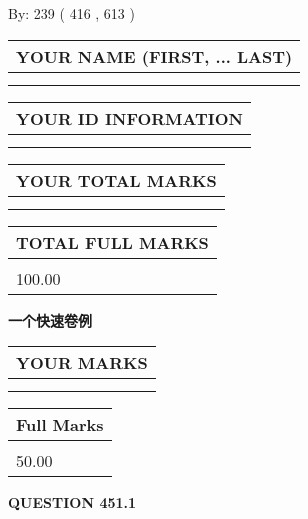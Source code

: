 \documentclass{ctexart}
\begin{document}
   
\hspace{1.0in} By: 
 239 ( 416 ,  613 )
   
   
   
   
\newpage 
\setcounter{page}{ 
   451001 } 
   
   
   
   
\noindent\begin{tabular}{|l|}
\hline
YOUR NAME (FIRST, ... LAST)  \\
\hline
 \\ 
 \\ 
\hline
\end{tabular}
\hspace{0.05in} \begin{tabular}{|l|}
\hline
 YOUR   ID   INFORMATION  \\
\hline
 \\ 
 \\ 
\hline
\end{tabular}
   
   
\vspace{0.2in}\noindent\begin{tabular}{|l|}
\hline
YOUR TOTAL MARKS  \\
\hline
 \\ 
 \\ 
\hline
\end{tabular}
\hspace{0.05in} \begin{tabular}{|l|}
\hline
TOTAL FULL MARKS  \\
\hline
 \\ 
100.00 \\
\hline
\end{tabular}
   
   
 \vspace{0.2in}
{\LARGE {\textbf{ 一个快速卷例}}}
   
   
  
\vspace{0.2in}
  
\noindent\begin{tabular}{|l|}
\hline
 YOUR MARKS  \\
\hline
 \\ 
 \\ 
\hline
\end{tabular}
\hspace{0.05in} \begin{tabular}{|l|}
\hline
 Full Marks  \\
\hline
 \\ 
50.00 \\
\hline
\end{tabular}
{\textbf{\Large{QUESTION
451.1 
}}}
  
\end{document}
